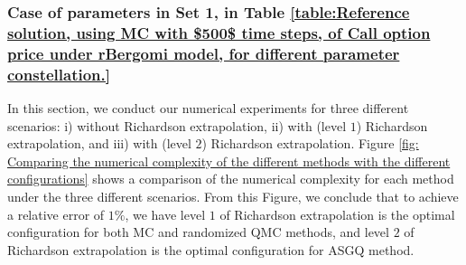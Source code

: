 \subsubsection{Case of parameters in Set 1, in Table \ref{table:Reference solution, using MC with $500$ time steps, of Call option price under rBergomi model, for different parameter constellation.} }
\label{sec:Case of set $2$ parameters_linear}
In this section, we conduct our numerical experiments for three different scenarios: i) without Richardson extrapolation, ii) with (level $1$) Richardson extrapolation, and iii) with (level $2$) Richardson extrapolation. Figure \ref{fig: Comparing the numerical complexity of the different  methods with the different configurations}  shows a comparison of the numerical complexity for each method under the three different scenarios. From this Figure, we conclude that to achieve a relative error of $1\%$, we have level $1$ of Richardson extrapolation is the optimal configuration for both MC and randomized QMC methods, and level $2$ of Richardson extrapolation is the optimal configuration for ASGQ  method.

